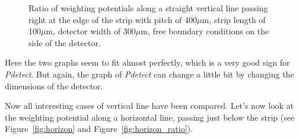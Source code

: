 \documentclass[11pt]{article}
\begin{document}
\begin{figure}[H]
\begin{minipage}[b]{.46\linewidth}
			\caption{Ratio of weighting potentials along a straight vertical line passing right at the edge
					of the strip with pitch
					of 400$\mu$m, strip length of 100$\mu$m, detector width of 300$\mu$m, free boundary conditions
					on the side of the detector.}
			\label{fig:edge_strip_ratio}
		\end{minipage}
	\end{figure}

	Here the two graphs seem to fit almost perfectly, which is a very good sign for \textit{Pdetect}.
	But again, the graph of \textit{Pdetect} can change a little bit by changing the dimensions
	of the detector.

	Now all interesting cases of vertical line have been compared. Let's now look at the weighting potential
	along a horizontal line, passing just below the strip (see Figure~\ref{fig:horizon} and
	Figure~\ref{fig:horizon_ratio}).
\end{document}
